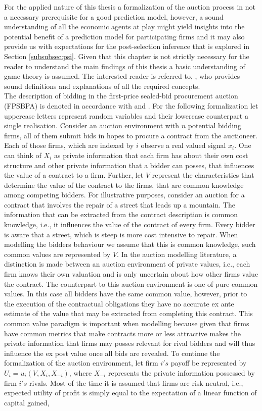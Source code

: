 \documentclass[a4paper,12pt, headsepline]{scrartcl}
\numberwithin{equation}{section}
\begin{document}
For the applied nature of this thesis a formalization of the auction process in not a necessary prerequisite 
for a good prediction model, however, a sound understanding of all the economic agents at play might yield insights into the potential benefit of a prediction model for participating firms and it may also provide us with expectations for the post-selection inference that is explored in Section \ref{subsubsec:psi}. Given that this chapter is not strictly necessary for the reader to understand the main findings of this thesis a basic understanding of game theory is assumed. The interested reader is referred to, \citet{tadelis12}, who provides sound definitions and explanations of all the required concepts.\\
The description of bidding in the first-price sealed-bid procurement auction (FPSBPA) is denoted in accordance with \citet{milgrom82} and \citet{HandbookIndustrialOrga}. For the following formalization let uppercase letters represent random variables and their lowercase counterpart a single realisation. Consider an auction environment with $n$ potential bidding firms, all of them submit bids in hopes to procure a contract from the auctioneer. Each of those firms, which are indexed by $i$ observe a real valued signal $x_i$. One can think of $X_i$ as private information that each firm has about their own cost structure and other private information that a bidder can posses, that influences the value of a contract to a firm. Further, let $V$ represent the characteristics that determine the value of the contract to the firms, that are common knowledge among competing bidders. For illustrative purposes, consider an auction for a contract that involves the repair of a street that leads up a mountain. The information that can be extracted from the contract description is common knowledge, i.e., it influences the value of the contract of every firm. Every bidder is aware that a street, which is steep is more cost intensive to repair. When modelling the bidders behaviour we assume that this is common knowledge, such common values are represented by $V$. In the auction modelling literature, a distinction is made between an auction environment of private values, i.e., each firm knows their own valuation and is only uncertain about how other firms value the contract. The counterpart to this auction environment is one of pure common values. In this case all bidders have the same common value, however, prior to the execution of the contractual obligations they have no accurate ex ante estimate of the value that may be extracted from completing this contract. This common value paradigm is important when modelling because given that firms have common metrics that make contracts more or less attractive makes the private information that firms may posses relevant for rival bidders and will thus influence the ex post value once all bids are revealed. To continue the formalization of the auction environment, let firm $i's$ payoff be represented by $U_i = u_i(V, X_i, X_{-i})$, where $X_{-i}$ represents the private information possessed by firm $i's$ rivals. Most of the time it is assumed that firms are risk neutral, i.e., expected utility of profit is simply equal to the expectation of a linear function of capital gained, 
\end{document}
